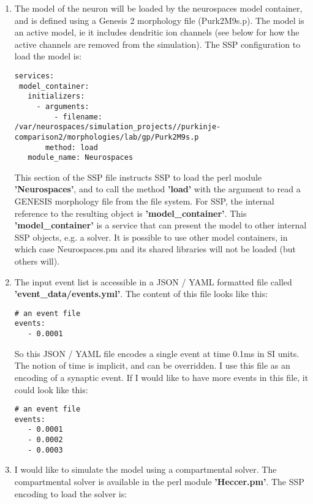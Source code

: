 \documentclass[12pt]{article}
\begin{document}
\begin{enumerate}
\item The model of the neuron will be loaded by the neurospaces model
  container, and is defined using a Genesis 2 morphology file
  (Purk2M9s.p).  The model is an active model, ie it includes
  dendritic ion channels (see below for how the active channels are
  removed from the simulation).  The SSP configuration to load the
  model is:\label{sec:email:-ssp-example}

\begin{verbatim}
services:
 model_container:
   initializers:
     - arguments:
         - filename: /var/neurospaces/simulation_projects//purkinje-comparison2/morphologies/lab/gp/Purk2M9s.p
       method: load
   module_name: Neurospaces
\end{verbatim}

  This section of the SSP file instructs SSP to load the perl module
  {\bf 'Neurospaces'}, and to call the method {\bf 'load'} with the
  argument to read a GENESIS morphology file from the file system.
  For SSP, the internal reference to the resulting object is {\bf
    'model\_container'}.  This {\bf 'model\_container'} is a service
  that can present the model to other internal SSP objects, e.g. a
  solver.  It is possible to use other model containers, in which case
  Neurospaces.pm and its shared libraries will not be loaded (but
  others will).

\item The input event list is accessible in a JSON / YAML formatted
  file called {\bf 'event\_data/events.yml'}.  The content of this
  file looks like this:

\begin{verbatim}
# an event file
events:
   - 0.0001
\end{verbatim}

  So this JSON / YAML file encodes a single event at time 0.1ms in SI
  units.  The notion of time is implicit, and can be overridden.  I
  use this file as an encoding of a synaptic event.  If I would like
  to have more events in this file, it could look like this:

\begin{verbatim}
# an event file
events:
   - 0.0001
   - 0.0002
   - 0.0003
\end{verbatim}

\item I would like to simulate the model using a compartmental solver.
  The compartmental solver is available in the perl module {\bf
    'Heccer.pm'}.  The SSP encoding to load the solver is:


\end{enumerate}
\end{document}
